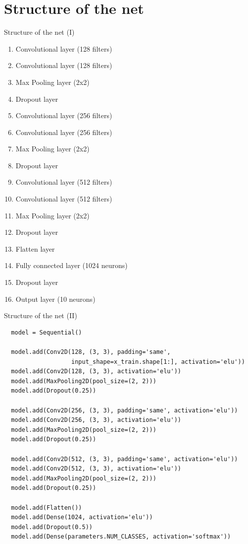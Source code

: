 \documentclass{beamer}
\begin{document}
\section{Structure of the net}

\begin{frame}[fragile]{Structure of the net (I)}
 \begin{multicols}{2}

  \begin{enumerate}
   \item<+-> Convolutional layer (128 filters)
   \item<+-> Convolutional layer (128 filters)
   \item<+-> Max Pooling layer (2x2)
   \item<+-> Dropout layer
   \item<+-> Convolutional layer (256 filters)
   \item<+-> Convolutional layer (256 filters)
   \item<+-> Max Pooling layer (2x2)
   \item<+-> Dropout layer
   \item<+-> Convolutional layer (512 filters)
   \item<+-> Convolutional layer (512 filters)
   \item<+-> Max Pooling layer (2x2)
   \item<+-> Dropout layer
   \item<+-> Flatten layer
   \item<+-> Fully connected layer (1024 neurons)
   \item<+-> Dropout layer
   \item<+-> Output layer (10 neurons)
  \end{enumerate}
 \end{multicols}


\end{frame}

\begin{frame}[fragile]{Structure of the net (II)}
 \begin{verbatim}
  model = Sequential()

  model.add(Conv2D(128, (3, 3), padding='same',
                   input_shape=x_train.shape[1:], activation='elu'))
  model.add(Conv2D(128, (3, 3), activation='elu'))
  model.add(MaxPooling2D(pool_size=(2, 2)))
  model.add(Dropout(0.25))

  model.add(Conv2D(256, (3, 3), padding='same', activation='elu'))
  model.add(Conv2D(256, (3, 3), activation='elu'))
  model.add(MaxPooling2D(pool_size=(2, 2)))
  model.add(Dropout(0.25))

  model.add(Conv2D(512, (3, 3), padding='same', activation='elu'))
  model.add(Conv2D(512, (3, 3), activation='elu'))
  model.add(MaxPooling2D(pool_size=(2, 2)))
  model.add(Dropout(0.25))

  model.add(Flatten())
  model.add(Dense(1024, activation='elu'))
  model.add(Dropout(0.5))
  model.add(Dense(parameters.NUM_CLASSES, activation='softmax'))

  \end{verbatim}
\end{frame}
\end{document}
